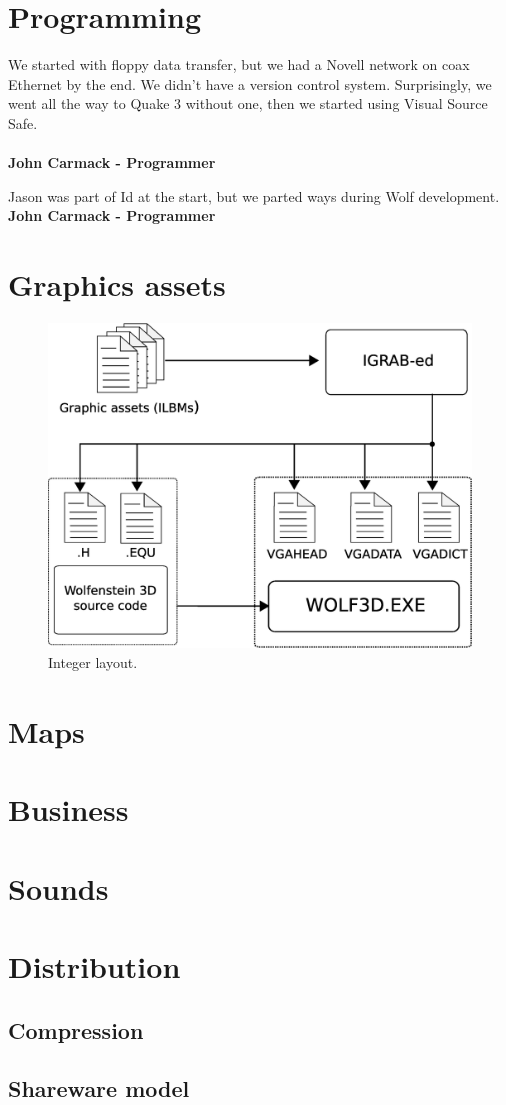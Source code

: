 \documentclass[book.tex]{subfiles}
\begin{document}
\section{Programming}

 \begin{fancyquotes}
We started with floppy data transfer, but we had a Novell network on coax Ethernet by the end.
 \bigskip
We didn’t have a version control system.  Surprisingly, we went all the way to Quake 3 without one, then we started using Visual Source Safe.\\
 \\
\textbf{John Carmack - Programmer}
\end{fancyquotes}


\begin{fancyquotes}
Jason was part of Id at the start, but we parted ways during Wolf development.
 \bigskip \\
\textbf{John Carmack - Programmer}
 \end{fancyquotes}
 
 
 
\section{Graphics assets}

\begin{figure}[H]
\centering
 \includegraphics[scale=0.4]{imgs/drawing_plain.eps}
 \caption{Integer layout.} \label{fig:mips}
 \end{figure}

\section{Maps}
\section{Business}
\section{Sounds}
\section{Distribution}
	\subsection{Compression}
	\subsection{Shareware model}
\end{document}
